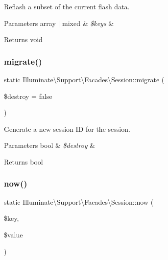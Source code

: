 Reflash a subset of the current flash data.


\begin{DoxyParams}[1]{Parameters}
array | mixed & {\em \$keys} & \\
\hline
\end{DoxyParams}
\begin{DoxyReturn}{Returns}
void 
\end{DoxyReturn}
\mbox{\label{class_illuminate_1_1_support_1_1_facades_1_1_session_a8ae6a969389f7bd5a9a237446f94a280}} 
\subsubsection{\texorpdfstring{migrate()}{migrate()}}
{\footnotesize\ttfamily static Illuminate\textbackslash{}\+Support\textbackslash{}\+Facades\textbackslash{}\+Session\+::migrate (\begin{DoxyParamCaption}\item[{}]{\$destroy = {\ttfamily false} }\end{DoxyParamCaption})\hspace{0.3cm}{\ttfamily [static]}}

Generate a new session ID for the session.


\begin{DoxyParams}[1]{Parameters}
bool & {\em \$destroy} & \\
\hline
\end{DoxyParams}
\begin{DoxyReturn}{Returns}
bool 
\end{DoxyReturn}
\mbox{\label{class_illuminate_1_1_support_1_1_facades_1_1_session_a29ea95ba8166d08816f5dd78d79fe6c8}} 
\subsubsection{\texorpdfstring{now()}{now()}}
{\footnotesize\ttfamily static Illuminate\textbackslash{}\+Support\textbackslash{}\+Facades\textbackslash{}\+Session\+::now (\begin{DoxyParamCaption}\item[{}]{\$key,  }\item[{}]{\$value }\end{DoxyParamCaption})\hspace{0.3cm}{\ttfamily [static]}}

